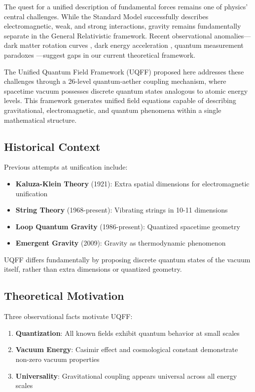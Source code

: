 \documentclass[12pt,a4paper]{article}
\begin{document}
The quest for a unified description of fundamental forces remains one of physics' central challenges. While the Standard Model successfully describes electromagnetic, weak, and strong interactions, gravity remains fundamentally separate in the General Relativistic framework. Recent observational anomalies—dark matter rotation curves \cite{McGaugh2016}, dark energy acceleration \cite{Riess1998}, quantum measurement paradoxes \cite{Zurek2003}—suggest gaps in our current theoretical framework.

The Unified Quantum Field Framework (UQFF) proposed here addresses these challenges through a 26-level quantum-aether coupling mechanism, where spacetime vacuum possesses discrete quantum states analogous to atomic energy levels. This framework generates unified field equations capable of describing gravitational, electromagnetic, and quantum phenomena within a single mathematical structure.

\subsection{Historical Context}

Previous attempts at unification include:
\begin{itemize}
    \item \textbf{Kaluza-Klein Theory} (1921): Extra spatial dimensions for electromagnetic unification \cite{Kaluza1921}
    \item \textbf{String Theory} (1968-present): Vibrating strings in 10-11 dimensions \cite{Polchinski1998}
    \item \textbf{Loop Quantum Gravity} (1986-present): Quantized spacetime geometry \cite{Rovelli2004}
    \item \textbf{Emergent Gravity} (2009): Gravity as thermodynamic phenomenon \cite{Verlinde2011}
\end{itemize}

UQFF differs fundamentally by proposing discrete quantum states of the vacuum itself, rather than extra dimensions or quantized geometry.

\subsection{Theoretical Motivation}

Three observational facts motivate UQFF:
\begin{enumerate}
    \item \textbf{Quantization}: All known fields exhibit quantum behavior at small scales
    \item \textbf{Vacuum Energy}: Casimir effect and cosmological constant demonstrate non-zero vacuum properties
    \item \textbf{Universality}: Gravitational coupling appears universal across all energy scales
\end{enumerate}
\end{document}
